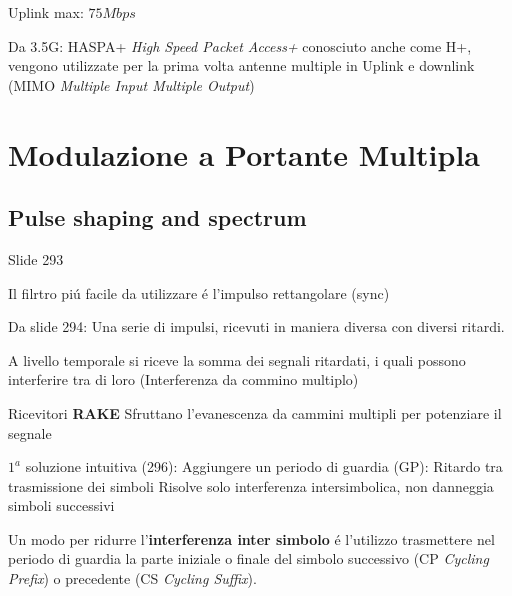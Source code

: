 \documentclass{article}
\begin{document}
%

Uplink max: $75Mbps$

Da 3.5G: HASPA+ \textit{High Speed Packet Access+} conosciuto anche come H+, vengono utilizzate per la prima volta antenne multiple in Uplink e downlink (MIMO \textit{Multiple Input Multiple Output})





\section{Modulazione a Portante Multipla}
\subsection{Pulse shaping and spectrum}
Slide 293


Il filrtro pi\'u facile da utilizzare \'e l'impulso rettangolare (sync)

Da slide 294: Una serie di impulsi, ricevuti in maniera diversa con diversi ritardi.

A livello temporale si riceve la somma dei segnali ritardati, i quali possono interferire tra di loro (Interferenza da commino multiplo)

Ricevitori \textbf{RAKE} Sfruttano l'evanescenza da cammini multipli per potenziare il segnale

$1^a$ soluzione intuitiva (296): Aggiungere un periodo di guardia (GP): Ritardo tra trasmissione dei simboli
Risolve solo interferenza intersimbolica, non danneggia simboli successivi

Un modo per ridurre l'\textbf{interferenza inter simbolo} \'e l'utilizzo trasmettere nel periodo di guardia la parte iniziale o finale del simbolo successivo (CP \textit{Cycling Prefix}) o precedente (CS \textit{Cycling Suffix}).
\end{document}
